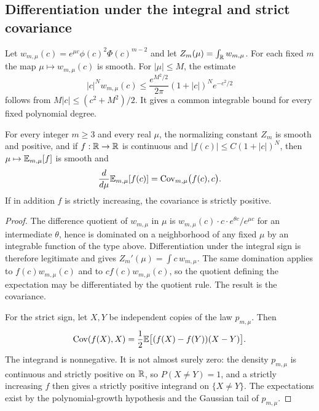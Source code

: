 \subsection{Differentiation under the integral and strict covariance}\label{sc:sub5}

Let \(w_{m,\mu}(c)=e^{\mu c}\phi(c)^2\Phi(c)^{m-2}\) and let \(Z_m(\mu)=\int_{\mathbb R}w_{m,\mu}\). For each fixed \(m\) the map \(\mu\mapsto w_{m,\mu}(c)\) is smooth. For \(|\mu|\le M\), the estimate
\[
 |c|^N w_{m,\mu}(c)
 \le \frac{e^{M^2/2}}{2\pi}(1+|c|)^N e^{-c^2/2}
\]
follows from \(M|c|\le(c^2+M^2)/2\). It gives a common integrable bound for every fixed polynomial degree.

\begin{lemma}\label{sc:lemma5.1}
For every integer \(m\ge 3\) and every real \(\mu\), the normalizing constant \(Z_m\) is smooth and positive, and if \(f:\mathbb R\to\mathbb R\) is continuous and \(|f(c)|\le C(1+|c|)^N\), then \(\mu\mapsto\mathbb E_{m,\mu}[f]\) is smooth and
\[
\frac{d}{d\mu}\mathbb E_{m,\mu}[f(c)]=\mathrm{Cov}_{m,\mu}\bigl(f(c),c\bigr).
\]
If in addition \(f\) is strictly increasing, the covariance is strictly positive.

\end{lemma}
\begin{proof}
The difference quotient of \(w_{m,\mu}\) in \(\mu\) is \(w_{m,\mu}(c)\cdot c\cdot e^{\theta c}/e^{\mu c}\) for an intermediate \(\theta\), hence is dominated on a neighborhood of any fixed \(\mu\) by an integrable function of the type above. Differentiation under the integral sign is therefore legitimate and gives \(Z_m'(\mu)=\int c\,w_{m,\mu}\). The same domination applies to \(f(c)w_{m,\mu}(c)\) and to \(c f(c)w_{m,\mu}(c)\), so the quotient defining the expectation may be differentiated by the quotient rule. The result is the covariance.

For the strict sign, let \(X,Y\) be independent copies of the law \(p_{m,\mu}\). Then
\[
\mathrm{Cov}(f(X),X)=\frac12\mathbb E\bigl[(f(X)-f(Y))(X-Y)\bigr].
\]
The integrand is nonnegative. It is not almost surely zero: the density \(p_{m,\mu}\) is continuous and strictly positive on \(\mathbb R\), so \(P(X\neq Y)=1\), and a strictly increasing \(f\) then gives a strictly positive integrand on \(\{X\neq Y\}\). The expectations exist by the polynomial-growth hypothesis and the Gaussian tail of \(p_{m,\mu}\).

\end{proof}

